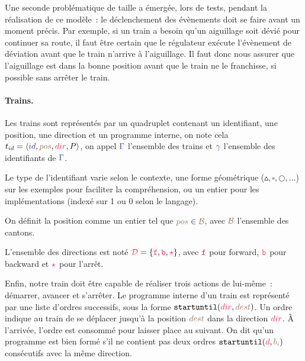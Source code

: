 \documentclass[oneside, a4paper, 11pt]{book}
\newcommand{\trainFmt}[1]{{\color{traincolor} #1}}
\newcommand{\trainTuple}[4]{\langle \trainFmt{#1}, \posFmt{#2}, \dirFmt{#3}, #4 \rangle}
\newcommand{\forward}{\ensuremath{\mathtt{f}}}
\newcommand{\backward}{\ensuremath{\mathtt{b}}}
\newcommand{\directions}{\dirFmt{\mathcal{D}}}
\newcommand{\dirFmt}[1]{{\color{dircolor} #1}}
\newcommand{\dirForward}{\ensuremath{\dirFmt{\forward}}}
\newcommand{\dirBackward}{\ensuremath{\dirFmt{\backward}}}
\newcommand{\dirStop}{\ensuremath{\dirFmt{\star}}}
\newcommand{\posFmt}[1]{{\color{poscolor}{#1}}}
\newcommand{\bid}[1]{\ensuremath{\posFmt{b_{#1}}}}
\newcommand{\su}[2]{{\mbox{$\mathtt{startuntil}(\dirFmt{#1}, \posFmt{#2})$}}}
\begin{document}
Une seconde problématique de taille a émergée, lors de tests, pendant la réalisation de ce modèle~: le déclenchement des évènements doit se faire avant un moment précis.
Par exemple, si un train a besoin qu'un aiguillage soit dévié pour continuer sa route, il faut être certain que le régulateur exécute l'évènement de déviation avant que le train n'arrive à l'aiguillage.
Il faut donc nous assurer que l'aiguillage est dans la bonne position avant que le train ne le franchisse, si possible sans arrêter le train.


\paragraph{Trains.} 
Les trains sont représentés par un quadruplet contenant un identifiant, une position, une direction et un programme interne, on note cela $t_{id} = \trainTuple{id}{pos}{dir}{P}$, on appel $\trainFmt{\Gamma}$ l'ensemble des trains et $\trainFmt{\gamma}$ l'ensemble des identifiants de $\trainFmt{\Gamma}$.

Le type de l'identifiant varie selon le contexte, une forme géométrique ($\vartriangle,\square,\bigcirc,\dots$) sur les exemples pour faciliter la compréhension, ou un entier pour les implémentations (indexé sur 1 ou 0 selon le langage).

On définit la position comme un entier tel que $\posFmt{pos} \in \posFmt{\mathcal{B}}$, avec $\posFmt{\mathcal{B}}$ l'ensemble des cantons. 

L'ensemble des directions est noté $\directions = \{ \dirForward, \dirBackward, \dirStop \}$, avec $\dirForward$ pour forward, $\dirBackward$ pour backward et $\dirStop$ pour l'arrêt.

Enfin, notre train doit être capable de réaliser trois actions de lui-même~: démarrer, avancer et s'arrêter.
Le programme interne d'un train est représenté par une liste d'ordres successifs, sous la forme \su{dir}{dest}.
Un ordre indique au train de se déplacer jusqu'à la position $\posFmt{dest}$ dans la direction $\dirFmt{dir}$. À l'arrivée, l'ordre est consommé pour laisser place au suivant.
On dit qu'un programme est bien formé s'il ne contient pas deux ordres \su{d}{\bid{i}} consécutifs avec la même direction.
\end{document}
